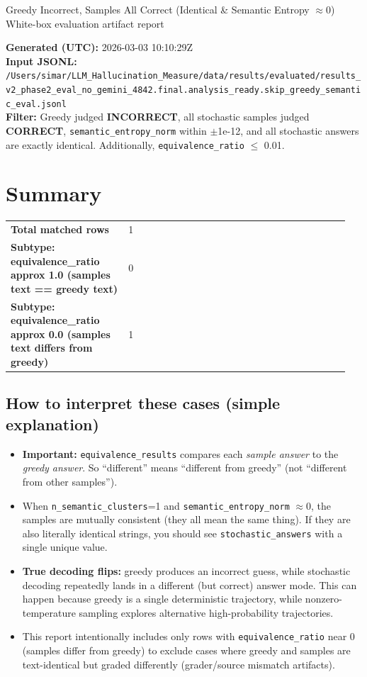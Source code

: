 \documentclass[11pt]{article}
\newcommand{\gradebad}[1]{\textcolor{red!70!black}{\textbf{#1}}}
\newcommand{\gradegood}[1]{\textcolor{green!50!black}{\textbf{#1}}}
\newcommand{\mono}[1]{\texttt{#1}}
\begin{document}
\begin{center}
{\LARGE Greedy Incorrect, Samples All Correct (Identical \& Semantic Entropy $\approx 0$)}\\[4pt]
{\large White-box evaluation artifact report}\\[6pt]
\end{center}
\textbf{Generated (UTC):} 2026-03-03 10:10:29Z\\
\textbf{Input JSONL:} \nolinkurl{/Users/simar/LLM_Hallucination_Measure/data/results/evaluated/results_v2_phase2_eval_no_gemini_4842.final.analysis_ready.skip_greedy_semantic_eval.jsonl}\\
\textbf{Filter:} Greedy judged \gradebad{INCORRECT}, all stochastic samples judged \gradegood{CORRECT}, \mono{semantic\_entropy\_norm} within $\pm$1e-12, and all stochastic answers are exactly identical. Additionally, \mono{equivalence\_ratio} $\le$ 0.01.
\section*{Summary}
\begin{tabular}{@{}p{0.33\linewidth}p{0.62\linewidth}@{}}
\textbf{Total matched rows} & 1 \\
\textbf{Subtype: equivalence\_ratio approx 1.0 (samples text == greedy text)} & 0 \\
\textbf{Subtype: equivalence\_ratio approx 0.0 (samples text differs from greedy)} & 1 \\
\end{tabular}
\subsection*{How to interpret these cases (simple explanation)}
\begin{itemize}
\item \textbf{Important:} \mono{equivalence\_results} compares each \emph{sample answer} to the \emph{greedy answer}. So ``different'' means ``different from greedy'' (not ``different from other samples'').
\item When \mono{n\_semantic\_clusters}=1 and \mono{semantic\_entropy\_norm} $\approx 0$, the samples are mutually consistent (they all mean the same thing). If they are also literally identical strings, you should see \mono{stochastic\_answers} with a single unique value.
\item \textbf{True decoding flips:} greedy produces an incorrect guess, while stochastic decoding repeatedly lands in a different (but correct) answer mode. This can happen because greedy is a single deterministic trajectory, while nonzero-temperature sampling explores alternative high-probability trajectories.
\item This report intentionally includes only rows with \mono{equivalence\_ratio} near 0 (samples differ from greedy) to exclude cases where greedy and samples are text-identical but graded differently (grader/source mismatch artifacts).
\end{itemize}
\end{document}
